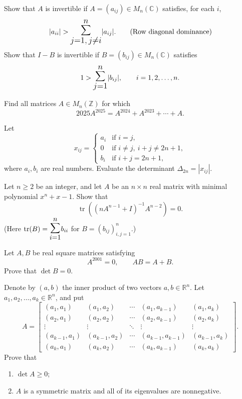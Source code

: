 \documentclass[12pt]{article}
\let\oldsum\sum
\renewcommand{\sum}{\mathlarger{\mathlarger{\oldsum}}}
\begin{document}
\begin{problem}
Show that $A$ is invertible if $A=(a_{ij})\in M_n(\mathbb{C})$ satisfies, for each $i$,
\[
|a_{ii}| > \sum_{j=1,\, j\ne i}^n |a_{ij}|. \qquad \text{(Row diagonal dominance)}
\]
Show that $I-B$ is invertible if $B=(b_{ij})\in M_n(\mathbb{C})$ satisfies
\[
1 > \sum_{j=1}^n |b_{ij}|, \qquad i=1,2,\dots,n.
\]
\end{problem}

\begin{problem}
Find all matrices $A \in M_n(\mathbb{Z})$ for which
\[
2025A^{2025} = A^{2024} + A^{2023} + \cdots + A.
\]
\end{problem}

\begin{problem}
Let
\[
x_{ij} =
\begin{cases}
a_i & \text{if } i = j, \\
0 & \text{if } i \neq j,\ i+j \neq 2n+1, \\
b_i & \text{if } i+j = 2n+1,
\end{cases}
\]
where $a_i, b_i$ are real numbers. Evaluate the determinant $\Delta_{2n} = |x_{ij}|$.
\end{problem}

\begin{problem}
Let $n \geq 2$ be an integer, and let $A$ be an $n \times n$ real matrix with minimal polynomial $x^n + x - 1$. Show that
\[
\operatorname{tr}\!\left((nA^{n-1}+I)^{-1}A^{n-2}\right) = 0.
\]
(Here $\operatorname{tr}(B) = \sum_{i=1}^n b_{ii}$ for $B = (b_{ij})_{i,j=1}^n$.)
\end{problem}

\begin{problem}
Let $A, B$ be real square matrices satisfying
\[
A^{2001} = 0, \qquad AB = A + B.
\]
Prove that $\det B = 0$.
\end{problem}

\begin{problem}
Denote by $(a,b)$ the inner product of two vectors $a, b \in \mathbb{R}^n$. Let $a_1, a_2, \dots, a_k \in \mathbb{R}^n$, and put
\[
A =
\begin{bmatrix}
(a_1,a_1) & (a_1,a_2) & \cdots & (a_1,a_{k-1}) & (a_1,a_k) \\
(a_2,a_1) & (a_2,a_2) & \cdots & (a_2,a_{k-1}) & (a_2,a_k) \\
\vdots & \vdots & \ddots & \vdots & \vdots \\
(a_{k-1},a_1) & (a_{k-1},a_2) & \cdots & (a_{k-1},a_{k-1}) & (a_{k-1},a_k) \\
(a_k,a_1) & (a_k,a_2) & \cdots & (a_k,a_{k-1}) & (a_k,a_k)
\end{bmatrix}.
\]
Prove that
\begin{enumerate}[label=\arabic*)]
\item $\det A \geq 0$;
\item $A$ is a symmetric matrix and all of its eigenvalues are nonnegative.
\end{enumerate}
\end{problem}
\end{document}
